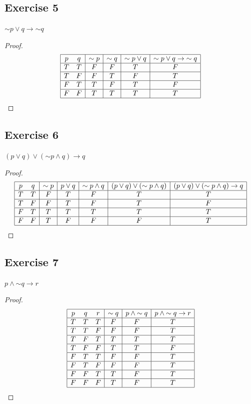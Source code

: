 \documentclass[14pt]{extarticle}
\begin{document}
\subsection{Exercise 5} ${\sim p} \vee q \to {\sim q}$
\begin{proof} $$ \begin{array}{|cc|c|c|c|c|} \hline p & q & {\sim p} & {\sim q}
& {\sim p} \vee q & {\sim p} \vee q \to {\sim q} \\ \hline T & T & F & F & T & F
\\ \hline T & F & F & T & F & T \\ \hline F & T & T & F & T & F \\ \hline F & F
& T & T & T & T \\ \hline \end{array} $$ \end{proof}

\subsection{Exercise 6} $(p \vee q) \vee ({\sim p} \wedge q) \to q$
\begin{proof} $$ \begin{array}{|cc|c|c|c|c|c|} \hline p & q & {\sim p} & p \vee
q & {\sim p} \wedge q & (p \vee q) \vee ({\sim p} \wedge q) & (p \vee q) \vee
({\sim p} \wedge q) \to q \\ \hline T & T & F & T & F & T & T \\ \hline T & F &
F & T & F & T & F \\ \hline F & T & T & T & T & T & T \\ \hline F & F & T & F &
F & F & T \\ \hline \end{array} $$ \end{proof}

\subsection{Exercise 7} $p \wedge {\sim q} \to r$
\begin{proof} $$ \begin{array}{|ccc|c|c|c|} \hline p & q & r & {\sim q} & p
\wedge {\sim q} & p \wedge {\sim q} \to r \\ \hline T & T & T & F & F & T \\
\hline T & T & F & F & F & T \\ \hline T & F & T & T & T & T \\ \hline T & F & F
& T & T & F \\ \hline F & T & T & F & F & T \\ \hline F & T & F & F & F & T \\
\hline F & F & T & T & F & T \\ \hline F & F & F & T & F & T \\ \hline
\end{array} $$ \end{proof}
\end{document}
